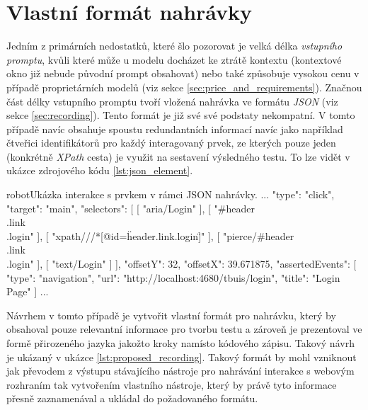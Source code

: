 \documentclass[czech, ma, kiv, he, iso690numb, pdf, viewonly]{fasthesis}
\begin{document}
    \section{Vlastní formát nahrávky}

    Jedním z primárních nedostatků, které šlo pozorovat je velká délka \textit{vstupního promptu}, kvůli které může u modelu docházet ke ztrátě kontextu (kontextové okno již nebude původní prompt obsahovat) nebo také způsobuje vysokou cenu v případě proprietárních modelů (viz sekce \ref{sec:price_and_requirements}). Značnou část délky vstupního promptu tvoří vložená nahrávka ve formátu \textit{JSON} (viz sekce \ref{sec:recording}). Tento formát je již své své podstaty nekompatní. V tomto případě navíc obsahuje spoustu redundantních informací navíc jako například čtveřici identifikátorů pro každý interagovaný prvek, ze kterých pouze jeden (konkrétně \textit{XPath} cesta) je využit na  sestavení výsledného testu. To lze vidět v ukázce zdrojového kódu \ref{lst:json_element}.

    \begin{code}{robot}{Ukázka interakce s prvkem v rámci JSON nahrávky. \label{lst:json_element}}
...
{
    "type": "click",
    "target": "main",
    "selectors": [
        [
            "aria/Login"
        ],
        [
            "#header\\.link\\.login"
        ],
        [
            "xpath///*[@id=\"header.link.login\"]"
        ],
        [
            "pierce/#header\\.link\\.login"
        ],
        [
            "text/Login"
        ]
    ],
    "offsetY": 32,
    "offsetX": 39.671875,
    "assertedEvents": [
        {
            "type": "navigation",
            "url": "http://localhost:4680/tbuis/login",
            "title": "Login Page"
        }
    ]
}
...  \end{code}

    Návrhem v tomto případě je vytvořit vlastní formát pro nahrávku, který by obsahoval pouze relevantní informace pro tvorbu testu a zároveň je prezentoval ve formě přirozeného jazyka jakožto kroky namísto kódového zápisu. Takový návrh je ukázaný v ukázce \ref{lst:proposed_recording}. Takový formát by mohl vzniknout jak převodem z výstupu stávajícího nástroje pro nahrávání interakce s webovým rozhraním tak vytvořením vlastního nástroje, který by právě tyto informace přesně zaznamenával a ukládal do požadovaného formátu.
\end{document}
